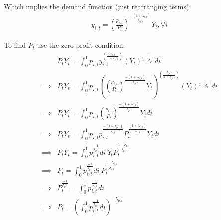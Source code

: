 \documentclass[article,11pt,letterpaper,fleqn]{article}
\theoremstyle{definition}
\numberwithin{equation}{section}
\begin{document}
Which implies the demand function (just rearranging terms):
\begin{equation}
\begin{split}
y_{i,t} =  \left(\frac{p_{i,t}}{P_{t}}\right)^{\frac{-(1+\lambda_{p,t})}{\lambda_{p,t}}}Y_{t}, \forall i
\end{split}
\end{equation}

To find $P_{t}$ use the zero profit condition:
\begin{equation}
\begin{split}
& P_{t}Y_{t} = \int_{0}^{1}p_{i,t}y_{i,t}^{\left(\frac{\lambda_{p,t}}{1+\lambda_{p,t}}\right)}(Y_{t})^{\frac{1}{1+\lambda_{p,t}}}di \\
\implies & P_{t}Y_{t} = \int_{0}^{1}p_{i,t}\left(\left(\frac{p_{i,t}}{P_{t}}\right)^{\frac{-(1+\lambda_{p,t})}{\lambda_{p,t}}}Y_{t}\right)^{\left(\frac{\lambda_{p,t}}{1+\lambda_{p,t}}\right)}(Y_{t})^{\frac{1}{1+\lambda_{p,t}}}di \\
\implies & P_{t}Y_{t} = \int_{0}^{1}p_{i,t}\left(\frac{p_{i,t}}{P_{t}}\right)^{\frac{-(1+\lambda_{p,t})}{\lambda_{p,t}}}Y_{t}di \\
\implies & P_{t}Y_{t} = \int_{0}^{1}p_{i,t}p_{i,t}^{\frac{-(1+\lambda_{p,t})}{\lambda_{p,t}}}P_{t}^{\frac{(1+\lambda_{p,t})}{\lambda_{p,t}}}Y_{t}di \\
\implies & P_{t}Y_{t} = \int_{0}^{1}p_{i,t}^{\frac{-1}{\lambda_{p,t}}}di \:  Y_{t}P_{t}^{\frac{1+\lambda_{p,t}}{\lambda_{p,t}}} \\
\implies & P_{t} = \int_{0}^{1}p_{i,t}^{\frac{-1}{\lambda_{p,t}}}di \: P_{t}^{\frac{1+\lambda_{p,t}}{\lambda_{p,t}}} \\
\implies & P_{t}^{\frac{-1}{\lambda_{p,t}}} = \int_{0}^{1}p_{i,t}^{\frac{-1}{\lambda_{p,t}}}di \\
\implies & P_{t} = \left(\int_{0}^{1}p_{i,t}^{\frac{-1}{\lambda_{p,t}}}di\right)^{-\lambda_{p,t}} \\
\end{split}
\end{equation}
\end{document}
